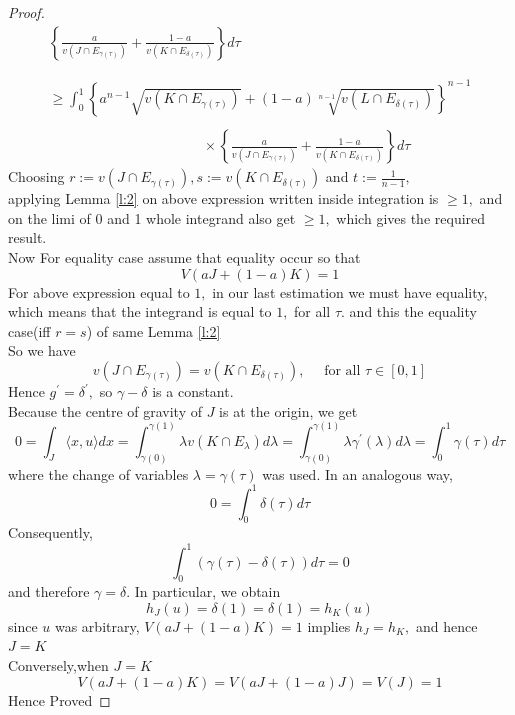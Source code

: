 \documentclass[oneside]{book}
\begin{document}
\begin{proof}
\[\begin{array}{l}
		\left\{\frac{a}{v\left(J \cap E_{\gamma(\tau)}\right)}+\frac{1-a}{v\left(K \cap E_{\delta(\tau)}\right)}\right\} d \tau \\\\\\
		\geq \int_{0}^{1} \left\{  a^{n-1} \sqrt{v\left(K \cap E_{\gamma(\tau)}\right)}+(1-a) \sqrt[n-1]{v\left(L \cap E_{\delta(\tau)}\right)} \right\}^{n-1} \\\\
		\quad \quad \quad \quad \quad \quad \quad \quad \quad \quad \quad \times \left\{ \frac{a}{v\left(J \cap E_{\gamma(\tau)}\right)}+\frac{1-a}{v\left(K \cap E_{\delta(\tau)}\right)}\right\} d \tau
		\end{array}
		\]
		Choosing $r:=v\left(J \cap E_{\gamma(\tau)}\right), s:=v\left(K \cap E_{\delta(\tau)}\right)$ and $t:=\frac{1}{n-1},$
		\\
		applying  Lemma \ref{l:2} on above expression written inside integration is $\geq 1,$ and on the limi of 0 and 1 whole integrand also get  $\geq 1,$ which gives the required result.
		\\
		Now For equality case assume that equality occur so that
		\[
		V(a J+(1-a) K) = 1 
		\]
		For above expression equal to $1,$ in our last estimation we must have equality, which means that the integrand  is equal to $1,$ for all $\tau .
		$ and this the equality case(iff $r = s$) of same Lemma \ref{l:2}
		\\
		So we have 
		\[
		v\left(J \cap                E_{\gamma(\tau)}\right)=v\left(K \cap E_{\delta(\tau)}\right), \quad \text { for all } \tau \in[0,1]
		\]
		Hence $g^{\prime}= \delta^{\prime},$ so $\gamma- \delta$ is a constant.\\
		Because the centre of gravity of $J$ is at the origin, we get 
		\\
		\[
		0=\int_{J}\langle x, u\rangle d x=\int_{\gamma(0)}^{\gamma(1)} \lambda v\left(K \cap E_{\lambda}\right) d \lambda=\int_{\gamma(0)}^{\gamma(1)} \lambda \gamma^{\prime}(\lambda) d \lambda=\int_{0}^{1} \gamma(\tau) d \tau
		\]
		where the change of variables $\lambda=\gamma(\tau)$ was used. In an analogous way,
		\[
		0=\int_{0}^{1} \delta(\tau) d \tau
		\]
		Consequently,
		\[
		\int_{0}^{1}(\gamma(\tau)-\delta(\tau)) d \tau=0
		\]
		and therefore $\gamma=\delta .$ In particular, we obtain
		\[
		h_{J}(u)=\delta(1)=\delta(1)=h_{K}(u)
		\]
		since $u$ was arbitrary, $V(a J+(1-a) K)=1$ implies $h_{J}=h_{K},$ and hence $J=K$ \\
		Conversely,when $J=K$ 
		$$V(a J+(1-a) K)=V(a J+(1-a) J) =  V(J) = 1 $$
		Hence Proved
	\end{proof}
	\hfill \break
	
\end{document}
